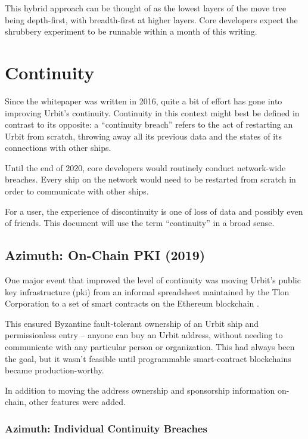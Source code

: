 \documentclass[twoside]{article}
\begin{document}
This hybrid approach can be thought of as the lowest layers of the move tree being depth-first, with breadth-first at higher layers.  Core developers expect the shrubbery experiment to be runnable within a month of this writing.

\section{Continuity}

Since the whitepaper was written in 2016, quite a bit of effort has gone into improving Urbit's continuity.  Continuity in this context might best be defined in contrast to its opposite: a ``continuity breach'' refers to the act of restarting an Urbit from scratch, throwing away all its previous data and the states of its connections with other ships.

Until the end of 2020, core developers would routinely conduct network-wide breaches.  Every ship on the network would need to be restarted from scratch in order to communicate with other ships.

For a user, the experience of discontinuity is one of loss of data and possibly even of friends.  This document will use the term ``continuity'' in a broad sense.

\subsection[Azimuth:  On-Chain {\sc pki} (2019)]{Azimuth: On-Chain PKI (2019)}

One major event that improved the level of continuity was moving Urbit's public key infrastructure ({\sc pki}) from an informal spreadsheet maintained by the Tlon Corporation to a set of smart contracts on the Ethereum blockchain \citep{WolfePauly2019}.

This ensured Byzantine fault-tolerant ownership of an Urbit ship and permissionless entry – anyone can buy an Urbit address, without needing to communicate with any particular person or organization.  This had always been the goal, but it wasn't feasible until programmable smart-contract blockchains became production-worthy.

In addition to moving the address ownership and sponsorship information on-chain, other features were added.

\subsubsection{Azimuth: Individual Continuity Breaches}
\end{document}
